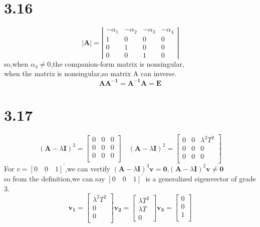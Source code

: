 \documentclass{article}
\begin{document}
\section*{3.16}
\[|\boldsymbol{A}|
=
\left|
\begin{array}{cccc}
-\alpha_1 & -\alpha_2 & -\alpha_3 & -\alpha_4\\
1 & 0 & 0 &0\\
0 & 1 & 0 &0\\
0& 0 &1 &0
\end{array}
\right|
\]
so,when $\alpha_4 \neq 0$,the companion-form matrix is nonsingular,\\
when the matrix is nonsingular,so matrix A can inverse.\\
\[\boldsymbol{AA^{-1}=A^{-1}A=E}\]

\section*{3.17}
\[
(\boldsymbol{A}-\lambda\boldsymbol{I})^3=
\left[
\begin{array}{ccc}
0 & 0 & 0\\
0 & 0 & 0\\
0 & 0 & 0\\
\end{array}
\right]
\quad
(\boldsymbol{A}-\lambda\boldsymbol{I})^2=
\left[
\begin{array}{ccc}
0 & 0 & \lambda^2T^2\\
0 & 0 &0\\
0 & 0 &0\\
\end{array}
\right]
\]
For $v=[0 \quad 0 \quad 1]^{\prime}$,we can vertify $(\boldsymbol{A}-\lambda\boldsymbol{I})^3\boldsymbol{v}=\boldsymbol{0}$,$(\boldsymbol{A}-\lambda\boldsymbol{I})^2\boldsymbol{v} \neq \boldsymbol{0}$\\
so from the definition,we can say $[0 \quad 0 \quad 1]^{\prime}$ is a generalized eigenvector of grade 3.\\
\[
\boldsymbol{v_1}=
\left[
\begin{array}{c}
\lambda^2T^2\\
0\\
0\\
\end{array}
\right]   
\boldsymbol{v_2}=
\left[
\begin{array}{c}
\lambda T^2\\
\lambda T\\
0
\end{array}
\right]
\boldsymbol{v_3}=
\left[
\begin{array}{c}
0\\
0\\
1\\
\end{array}
\right]
\]
\end{document}

